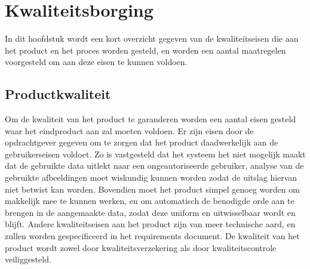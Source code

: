 \section{Kwaliteitsborging}
\label{kwaliteit}
In dit hoofdstuk wordt een kort overzicht gegeven van de kwaliteitseisen die aan het product en het proces worden gesteld,
en worden een aantal maatregelen voorgesteld om aan deze eisen te kunnen voldoen.






\subsection{Productkwaliteit}
Om de kwaliteit van het product te garanderen worden een aantal eisen gesteld waar het eindproduct aan zal moeten voldoen.
Er zijn eisen door de opdrachtgever gegeven om te zorgen dat het product daadwerkelijk aan de gebruikerseisen voldoet.
Zo is vastgesteld dat het systeem het niet mogelijk maakt dat de gebruikte data uitlekt naar een ongeautoriseerde gebruiker,
analyse van de gebruikte afbeeldingen moet wiskundig kunnen worden zodat de uitslag hiervan niet betwist kan worden.
Bovendien moet het product simpel genoeg worden om makkelijk mee te kunnen werken,
en om automatisch de benodigde orde aan te brengen in de aangemaakte data, zodat deze uniform en uitwisselbaar wordt en blijft.
Andere kwaliteitseisen aan het product zijn van meer technische aard, en zullen worden gespecificeerd in het requirements document. %
De kwaliteit van het product wordt zowel door kwaliteitsverzekering als door kwaliteitscontrole veiliggesteld.


